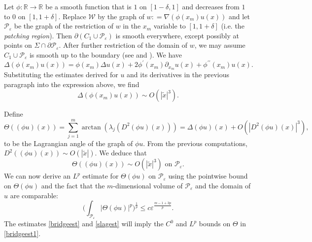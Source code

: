 \documentclass[11pt]{amsart}
\theoremstyle{definition}
\theoremstyle{remark}
\newcommand{\R}{\mathbb{R}}
\begin{document}
Let $\phi : \R \rightarrow \R$ be a smooth function that is $1$ on $[1-\delta, 1]$ and decreases from $1$ to $0$ on $[1, 1+\delta]$. Replace $\mathscr{W}$ by the graph of $w: = \nabla(\phi(x_m)u(x))$ and let $\mathscr{P}_\varepsilon$ be the graph of the restriction of $w$ in the $x_m$ variable to $[1, 1+\delta]$ (i.e. the \emph{patching region}). Then $\partial(C_1 \cup \mathscr{P}_\varepsilon)$ is smooth everywhere, except possibly at points on $\Sigma \cap \partial \mathscr{P}_\varepsilon$. After further restriction of the domain of $w$, we may assume $C_1\cup \mathscr{P}_\varepsilon$ is smooth up to the boundary (see \cite[Section 2]{Sm87} and \cite[Section 7.2]{Dim25}). We have
\[\Delta (\phi(x_m)u(x)) = \phi(x_m)\Delta u(x) + 2\phi^{ \prime}(x_m) \partial_{x_m} u(x) + \phi^{\prime \prime}(x_m)u(x). \]
Substituting the estimates derived for $u$ and its derivatives in the previous paragraph into the expression above, we find
\[\Delta(\phi(x_m)u(x)) \sim O(|\tilde{x}|^3).\]

Define
\[
\Theta((\phi u)(x)) = \sum_{j = 1}^m \arctan(\lambda_j(D^2(\phi u)(x))) =  \Delta (\phi u)(x) + O(|D^2 (\phi u)(x)|^3),\]
to be the Lagrangian angle of the graph of $\phi u$. From the previous computations, $D^2((\phi u)(x)) \sim O(|\tilde{x}|)$. We deduce that 
\begin{equation}
    \Theta((\phi u)(x)) \sim O(|\tilde{x}|^3) \text{ on } \mathscr{P}_\varepsilon. \label{bridgeest}
\end{equation}
We can now derive an $L^p$ estimate for $\Theta(\phi u)$ on $\mathscr{P}_\varepsilon$ using the pointwise bound on $\Theta(\phi u)$ and the fact that the $m$-dimensional volume of $\mathscr{P}_\varepsilon$ and the domain of $u$ are comparable:
\begin{equation}
    \Big(\int_{\mathscr{P}_\varepsilon} |\Theta(\phi u)|^p \Big)^{\frac{1}{p}} \leq c \varepsilon^{\frac{m-1+3p}{p}}. \label{slagest}
\end{equation}
The estimates \eqref{bridgeest} and \eqref{slagest} will imply the $C^0$ and $L^p$ bounds on $\Theta$ in \eqref{bridgeest1}.
\end{document}
